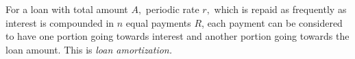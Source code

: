 \begin{definition}
    For a loan with total amount \(A,\) periodic rate \(r,\) which is repaid as frequently as interest is compounded in \(n\) equal payments \(R\), each payment can be considered to have one portion going towards interest and another portion going towards the loan amount. This is \emph{loan amortization.}
\end{definition}